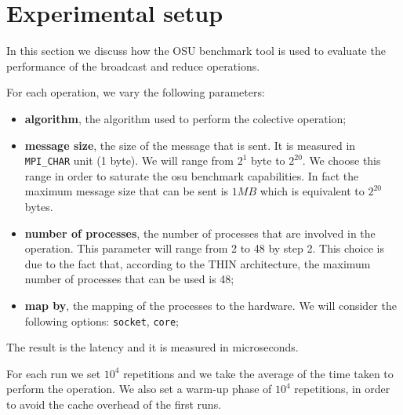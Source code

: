 \section{Experimental setup}

In this section we discuss how the OSU benchmark tool is used to evaluate the performance of the broadcast and reduce operations. 

For each operation, we vary the following parameters:
\begin{itemize}
    \item \textbf{algorithm}, the algorithm used to perform the colective operation;
    \item \textbf{message size}, the size of the message that is sent. It is measured in \texttt{MPI\_CHAR} unit (1 byte). We will range from $2^1$ byte to $2^{20}$. We choose this range in order to saturate the osu benchmark capabilities. In fact the maximum message size that can be sent is $1MB$ which is equivalent to $2^{20}$ bytes. 
    \item \textbf{number of processes}, the number of processes that are involved in the operation. This parameter will range from 2 to 48 by step 2. This choice is due to the fact that, according to the THIN architecture, the maximum number of processes that can be used is 48;
    \item \textbf{map by}, the mapping of the processes to the hardware. We will consider the following options: \texttt{socket}, \texttt{core};
\end{itemize}

The result is the latency and it is measured in microseconds. 

For each run we set $10^4$ repetitions and we take the average of the time taken to perform the operation. We also set a warm-up phase of $10^4$ repetitions, in order to avoid the cache overhead of the first runs.
